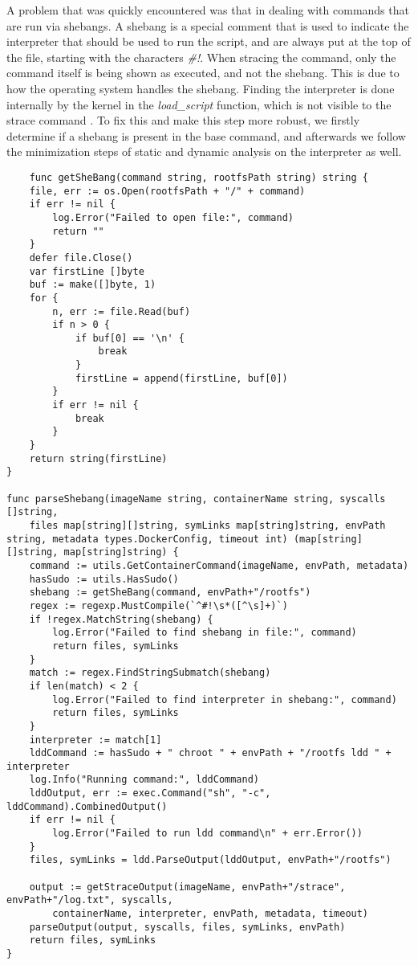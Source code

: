 A problem that was quickly encountered was that in dealing with commands that are run via shebangs.
A shebang is a special comment that is used to indicate the interpreter that should be used to run the script, and are always 
put at the top of the file, starting with the characters \textit{\#!}.
When stracing the command, only the command itself is being shown as executed, and not the shebang. This is due 
to how the operating system handles the shebang. Finding the interpreter is done internally by the kernel in the
\textit{load_script} function, which is not visible to the strace command \cite{demystifying-shebang}. 
To fix this and make this step more robust, we firstly determine if a shebang is present in the base command, and afterwards 
we follow the minimization steps of static and dynamic analysis on the interpreter as well.

\lstset{language=Go,caption=Parsing and determening shebang dependencies utility,label=lst:shebang-parser}
\begin{lstlisting}
    func getSheBang(command string, rootfsPath string) string {
	file, err := os.Open(rootfsPath + "/" + command)
	if err != nil {
		log.Error("Failed to open file:", command)
		return ""
	}
	defer file.Close()
	var firstLine []byte
	buf := make([]byte, 1)
	for {
		n, err := file.Read(buf)
		if n > 0 {
			if buf[0] == '\n' {
				break
			}
			firstLine = append(firstLine, buf[0])
		}
		if err != nil {
			break
		}
	}
	return string(firstLine)
}

func parseShebang(imageName string, containerName string, syscalls []string,
	files map[string][]string, symLinks map[string]string, envPath string, metadata types.DockerConfig, timeout int) (map[string][]string, map[string]string) {
	command := utils.GetContainerCommand(imageName, envPath, metadata)
	hasSudo := utils.HasSudo()
	shebang := getSheBang(command, envPath+"/rootfs")
	regex := regexp.MustCompile(`^#!\s*([^\s]+)`)
	if !regex.MatchString(shebang) {
		log.Error("Failed to find shebang in file:", command)
		return files, symLinks
	}
	match := regex.FindStringSubmatch(shebang)
	if len(match) < 2 {
		log.Error("Failed to find interpreter in shebang:", command)
		return files, symLinks
	}
	interpreter := match[1]
	lddCommand := hasSudo + " chroot " + envPath + "/rootfs ldd " + interpreter
	log.Info("Running command:", lddCommand)
	lddOutput, err := exec.Command("sh", "-c", lddCommand).CombinedOutput()
	if err != nil {
		log.Error("Failed to run ldd command\n" + err.Error())
	}
	files, symLinks = ldd.ParseOutput(lddOutput, envPath+"/rootfs")

	output := getStraceOutput(imageName, envPath+"/strace", envPath+"/log.txt", syscalls,
		containerName, interpreter, envPath, metadata, timeout)
	parseOutput(output, syscalls, files, symLinks, envPath)
	return files, symLinks
}
\end{lstlisting}


